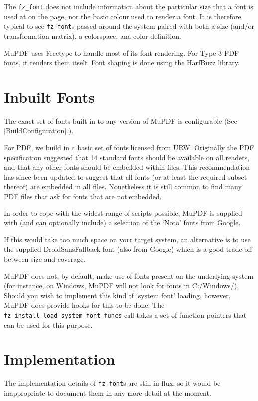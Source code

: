 \documentclass[oneside]{book}
\newcommand{\rjwref}[1] {\autoref{#1} \nameref{#1}}
\begin{document}
The \texttt{fz\_font} does not include information about the particular size that a font is used at on the page, nor the basic colour used to render a font. It is therefore typical to see \texttt{fz\_font}s passed around the system paired with both a size (and/or transformation matrix), a colorspace, and color definition.

MuPDF uses Freetype to handle most of its font rendering. For Type 3 PDF fonts, it renders them itself. Font shaping is done using the HarfBuzz library.

\section{Inbuilt Fonts}

The exact set of fonts built in to any version of MuPDF is configurable (See \rjwref{BuildConfiguration}).

For PDF, we build in a basic set of fonts licensed from URW. Originally the PDF specification suggested that 14 standard fonts should be available on all readers, and that any other fonts should be embedded within files. This recommendation has since been updated to suggest that all fonts (or at least the required subset thereof) are embedded in all files. Nonetheless it is still common to find many PDF files that ask for fonts that are not embedded.

In order to cope with the widest range of scripts possible, MuPDF is supplied with (and can optionally include) a selection of the `Noto' fonts from Google.

If this would take too much space on your target system, an alternative is to use the supplied DroidSansFallback font (also from Google) which is a good trade-off between size and coverage.

MuPDF does not, by default, make use of fonts present on the underlying system (for instance, on Windows, MuPDF will not look for fonts in C:/Windows/). Should you wish to implement this kind of `system font' loading, however, MuPDF does provide hooks for this to be done. The \texttt{fz\_install\_load\_system\_font\_funcs} call takes a set of function pointers that can be used for this purpose.

\section{Implementation}

The implementation details of \texttt{fz\_font}s are still in flux, so it would be inappropriate to document them in any more detail at the moment.
\end{document}
